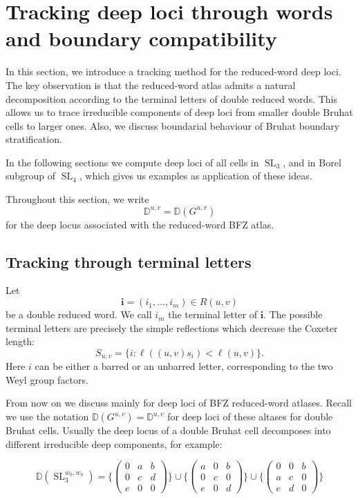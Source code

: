 \documentclass[12pt]{amsart}
\newcommand{\D}{\mathbb D}
\newcommand{\SL}{\operatorname{SL}}
\theoremstyle{plain}
\theoremstyle{definition}
\theoremstyle{remark}
\begin{document}
\section{Tracking deep loci through words and boundary compatibility}\label{sec:tracking}
In this section, we introduce a tracking method for the reduced-word deep loci. The key observation is that the reduced-word atlas admits a natural decomposition according to the terminal letters of double reduced words. This allows us to trace irreducible components of deep loci from smaller double Bruhat cells to larger ones. Also, we discuss boundarial behaviour of Bruhat boundary stratification. 

In the following sections we compute deep loci of all cells in $\SL_3$, and in Borel subgroup of $\SL_4$, which gives us examples as application of these ideas.

Throughout this section, we write
\[
\D^{u,v}=\D(G^{u,v})
\]
for the deep locus associated with the reduced-word BFZ atlas.

\subsection{Tracking through terminal letters}

Let
\[
\mathbf i=(i_1,\ldots,i_m)\in R(u,v)
\]
be a double reduced word. We call $i_m$ the terminal letter of
$\mathbf i$. The possible terminal letters are precisely the simple
reflections which decrease the Coxeter length:
\[
S_{u,v}
=
\{i:\ell((u,v)s_i)<\ell(u,v)\}.
\]
Here $i$ can be either a barred or an unbarred letter, corresponding
to the two Weyl group factors.

From now on we discuss mainly for deep loci of BFZ reduced-word atlases. Recall we use the notation $\D(G^{u,v})=\D^{u,v}$ for deep loci of these altases for double Bruhat cells. Usually the deep locus of a double Bruhat cell decomposes into different irreducible deep components, for example:

\[
\D(\SL_3^{w_0,w_0})=\{ \left( \begin{matrix}
0 & a & b\\
0 & c & d\\
e & 0 & 0 
\end{matrix}\right) \} \cup \{ \left(\begin{matrix}
a & 0 & b\\
0 & c & 0\\
e & 0 & d 
\end{matrix}\right)\}\cup \{\left(\begin{matrix}
0 & 0 & b\\
a & c & 0\\
e & d & 0 
\end{matrix}\right)\}
\]
\end{document}
